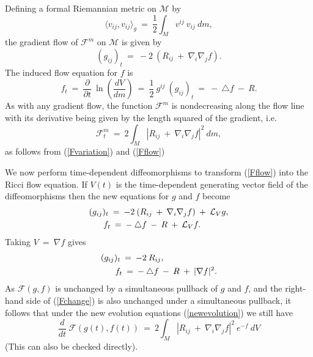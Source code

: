 Defining a formal Riemannian metric on ${\mathcal M}$ by
\begin{equation}
\langle v_{ij}, v_{ij} \rangle_{g} \: = \: \frac12
\int_M v^{ij} \: v_{ij} \: dm,
\end{equation}
the gradient flow of ${\mathcal F}^m$ on ${\mathcal M}$
is given by
\begin{equation} \label{Fflow}
(g_{ij})_t \: = \: -2 \: (R_{ij} \: + \: \nabla_i \nabla_j f).
\end{equation}
The induced flow equation for $f$ is
\begin{equation}
f_t \: = \: \frac{\partial}{\partial t} \: \ln \left( \frac{dV}{dm}\right)
\: = \: \frac12 \: g^{ij} \: (g_{ij})_t \: = \: - \: \triangle f \: - \: R.
\end{equation}
As with any gradient flow, the function ${\mathcal F}^m$ is nondecreasing
along the flow line with its derivative being given by the
length squared of the gradient, i.e.
\begin{equation} \label{Fchange}
{\mathcal F}^m_t \: = \: 2 \int_M |R_{ij} \: + \: \nabla_i \nabla_j f|^2 \: dm,
\end{equation}
as follows from (\ref{Fvariation}) and (\ref{Fflow})

We now perform time-dependent
diffeomorphisms to transform (\ref{Fflow}) into the
Ricci flow equation. If $V(t)$ is the time-dependent generating vector field
of the diffeomorphisms then the new equations for $g$ and $f$ become
\begin{align}
(g_{ij})_t \: & = \: -2 \: (R_{ij} \: + \: \nabla_i \nabla_j f) \: + \:
{\mathcal L}_V g, \\
f_t & \: = \: - \: \triangle f \: - \: R \: + \: {\mathcal L}_V f. \notag
\end{align}
Taking $V \: = \: \nabla f$ gives
\begin{align} \label{newevolution}
(g_{ij})_t \: & = \: -2 \: R_{ij}, \\
f_t & \: = \: - \: \triangle f \: - \: R \: + \: |\nabla f|^2. \notag
\end{align}
As ${\mathcal F}(g, f)$ is unchanged by a simultaneous pullback of $g$ and $f$,
and the right-hand side of (\ref{Fchange}) is also unchanged under a
simultaneous pullback, it follows that
under the new evolution equations (\ref{newevolution})
we still have
\begin{equation} \label{Fder}
\frac{d}{dt} \: {\mathcal F}(g(t), f(t)) \: = \:
2 \int_M |R_{ij} \: + \: \nabla_i \nabla_j f|^2 \: e^{-f} \: dV
\end{equation}
(This can also be checked directly).

